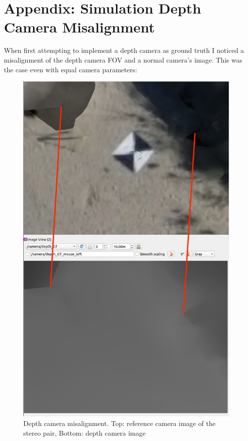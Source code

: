 \chapter{Appendix: Simulation Depth Camera Misalignment}\label{sec:appendix:gz_depth_camera}

When first attempting to implement a depth camera as ground truth I noticed a misalignment of the depth camera FOV and a normal camera's image. This was the case even with equal camera parameters:


\begin{figure}[ht]
    \centering
    \includegraphics[scale=0.4]{images/appendix/GT_error/GT_image.png}
    \caption{Depth camera misalignment. Top: reference camera image of the stereo pair, Bottom: depth camera image}
    \label{fig:GT_error_sim}
\end{figure}


